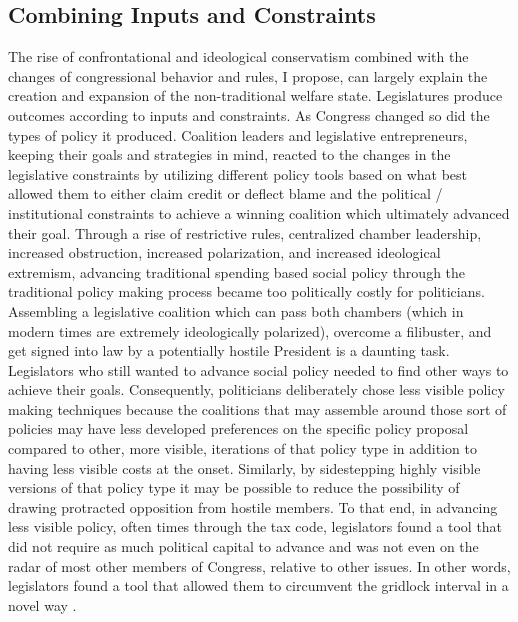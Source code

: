 \documentclass[12pt]{article}
\begin{document}
\subsection{Combining Inputs and Constraints}
The rise of confrontational and ideological conservatism combined with the changes of congressional behavior and rules, I propose, can largely explain the creation and expansion of the non-traditional welfare state. Legislatures produce outcomes according to inputs and constraints. As Congress changed so did the types of policy it produced. Coalition leaders and legislative entrepreneurs, keeping their goals and strategies in mind, reacted to the changes in the legislative constraints by utilizing different policy tools based on what best allowed them to either claim credit or deflect blame and the political / institutional constraints to achieve a winning coalition which ultimately advanced their goal. Through a rise of restrictive rules, centralized chamber leadership, increased obstruction, increased polarization, and increased ideological extremism, advancing traditional spending based social policy through the traditional policy making process became too politically costly for politicians. Assembling a legislative coalition which can pass both chambers (which in modern times are extremely ideologically polarized), overcome a filibuster, and get signed into law by a potentially hostile President is a daunting task. Legislators who still wanted to advance social policy needed to find other ways to achieve their goals. Consequently, politicians deliberately chose less visible policy making techniques because the coalitions that may assemble around those sort of policies may have less developed preferences on the specific policy proposal compared to other, more visible, iterations of that policy type in addition to having less visible costs at the onset. Similarly, by sidestepping highly visible versions of that policy type it may be possible to reduce the possibility of drawing protracted opposition from hostile members. To that end, in advancing less visible policy, often times through the tax code, legislators found a tool that did not require as much political capital to advance and was not even on the radar of most other members of Congress, relative to other issues. In other words, legislators found a tool that allowed them to circumvent the gridlock interval in a novel way \citep{krehbiel1998, binder2003}.
\end{document}
